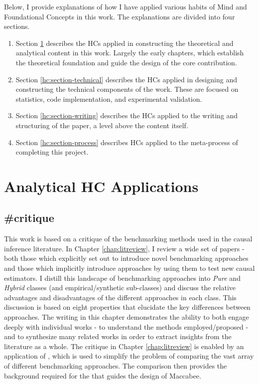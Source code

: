 \documentclass[./main.tex]{subfiles}
\begin{document}
Below, I provide explanations of how I have applied various habits of Mind and Foundational Concepts in this work. The explanations are divided into four sections.

\begin{enumerate}
    \item Section \ref{hc:section-analytical} describes the HCs applied in constructing the theoretical and analytical content in this work. Largely the early chapters, which establish the theoretical foundation and guide the design of the core contribution.
    
    \item Section \ref{hc:section-technical} describes the HCs applied in designing and constructing the technical components of the work. These are focused on statistics, code implementation, and experimental validation.
    
    \item Section \ref{hc:section-writing} describes the HCs applied to the writing and structuring of the paper, a level above the content itself.
    
    \item Section \ref{hc:section-process} describes HCs applied to the meta-process of completing this project.
\end{enumerate}

\section{Analytical HC Applications}
\label{hc:section-analytical}

\subsection*{\textbf{\#critique}}
\label{hc:critique}

This work is based on a critique of the benchmarking methods used in the causal inference literature. In Chapter \ref{chap:litreview}, I review a wide set of papers - both those which explicitly set out to introduce novel benchmarking approaches and those which implicitly introduce approaches by using them to test new causal estimators. I distill this landscape of benchmarking approaches into \textit{Pure} and \textit{Hybrid} classes (and empirical/synthetic sub-classes) and discuss the relative advantages and disadvantages of the different approaches in each class. This discussion is based on eight properties that elucidate the key differences between approaches. The writing in this chapter demonstrates the ability to both engage deeply with individual works - to understand the methods employed/proposed - and to synthesize many related works in order to extract insights from the literature as a whole. The critique in Chapter \ref{chap:litreview} is enabled by an application of , which is used to simplify the problem of comparing the vast array of different benchmarking approaches. The comparison then provides the background required for the  that guides the design of Maccabee.
\end{document}
